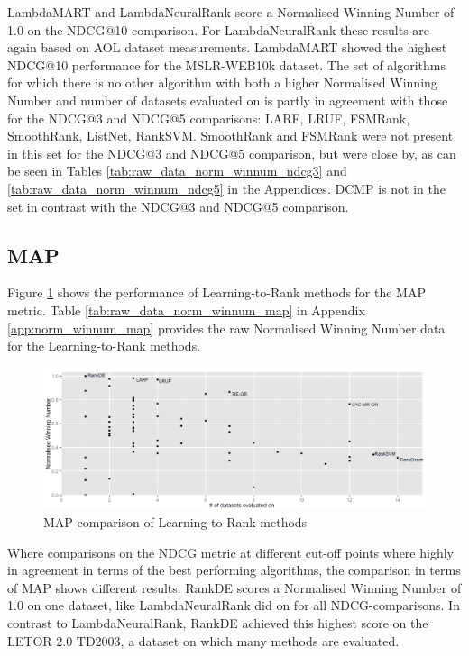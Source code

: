 \documentclass{sig-alternate-2013}
\begin{document}
LambdaMART and LambdaNeuralRank score a Normalised Winning Number of 1.0 on the NDCG@10 comparison. For LambdaNeuralRank these results are again based on AOL dataset measurements. LambdaMART showed the highest NDCG@10 performance for the MSLR-WEB10k dataset. The set of algorithms for which there is no other algorithm with both a higher Normalised Winning Number and number of datasets evaluated on is partly in agreement with those for the NDCG@3 and NDCG@5 comparisons: {LARF, LRUF, FSMRank, SmoothRank, ListNet, RankSVM}. SmoothRank and FSMRank were not present in this set for the NDCG@3 and NDCG@5 comparison, but were close by, as can be seen in Tables \ref{tab:raw_data_norm_winnum_ndcg3} and \ref{tab:raw_data_norm_winnum_ndcg5} in the Appendices. DCMP is not in the set in contrast with the NDCG@3 and NDCG@5 comparison.

\subsection{MAP}
Figure \ref{fig:normalised_winning_number_map} shows the performance of Learning-to-Rank methods for the MAP metric. Table \ref{tab:raw_data_norm_winnum_map} in Appendix \ref{app:norm_winnum_map} provides the raw Normalised Winning Number data for the Learning-to-Rank methods.\\

\begin{figure}[!h]
\includegraphics[scale=0.285]{gfx/map_winnum}
\caption{MAP comparison of Learning-to-Rank methods}
\label{fig:normalised_winning_number_map}
\end{figure}

Where comparisons on the NDCG metric at different cut-off points where highly in agreement in terms of the best performing algorithms, the comparison in terms of MAP shows different results. RankDE scores a Normalised Winning Number of 1.0 on one dataset, like LambdaNeuralRank did on for all NDCG-comparisons. In contrast to LambdaNeuralRank, RankDE achieved this highest score on the LETOR 2.0 TD2003, a dataset on which many methods are evaluated.\\
\end{document}
